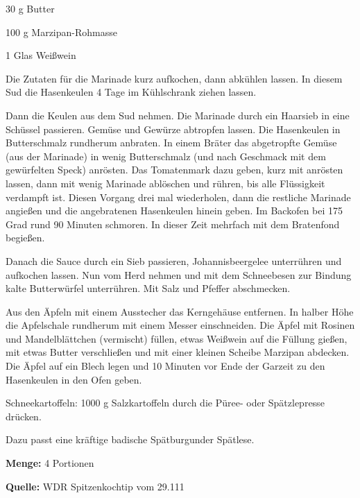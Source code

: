 {\begin{multicols}{2}
30 g Butter

100 g Marzipan-Rohmasse

1 Glas Weißwein


\end{multicols}

Die Zutaten für die Marinade kurz aufkochen, dann abkühlen lassen. In diesem Sud die Hasenkeulen 4 Tage im Kühlschrank ziehen lassen.

Dann die Keulen aus dem Sud nehmen. Die Marinade durch ein Haarsieb in eine Schüssel passieren. Gemüse und Gewürze abtropfen lassen. Die Hasenkeulen in Butterschmalz rundherum anbraten. In einem Bräter das abgetropfte Gemüse (aus der Marinade) in wenig Butterschmalz (und nach Geschmack mit dem gewürfelten Speck) anrösten. Das Tomatenmark dazu geben, kurz mit anrösten lassen, dann mit wenig Marinade ablöschen und rühren, bis alle Flüssigkeit verdampft ist. Diesen Vorgang drei mal wiederholen, dann die restliche Marinade angießen und die angebratenen Hasenkeulen hinein geben. Im Backofen bei 175 Grad rund 90 Minuten schmoren. In dieser Zeit mehrfach mit dem Bratenfond begießen.

Danach die Sauce durch ein Sieb passieren, Johannisbeergelee unterrühren und aufkochen lassen. Nun vom Herd nehmen und mit dem Schneebesen zur Bindung kalte Butterwürfel unterrühren. Mit Salz und Pfeffer abschmecken.

Aus den Äpfeln mit einem Ausstecher das Kerngehäuse entfernen. In halber Höhe die Apfelschale rundherum mit einem Messer einschneiden. Die Äpfel mit Rosinen und Mandelblättchen (vermischt) füllen, etwas Weißwein auf die Füllung gießen, mit etwas Butter verschließen und mit einer kleinen Scheibe Marzipan abdecken. Die Äpfel auf ein Blech legen und 10 Minuten vor Ende der Garzeit zu den Hasenkeulen in den Ofen geben.

Schneekartoffeln: 1000 g Salzkartoffeln durch die Püree- oder Spätzlepresse drücken.

Dazu passt eine kräftige badische Spätburgunder Spätlese.


{\bfseries Menge:} 4 Portionen

{\bfseries Quelle:} WDR Spitzenkochtip vom 29.111 

} 

